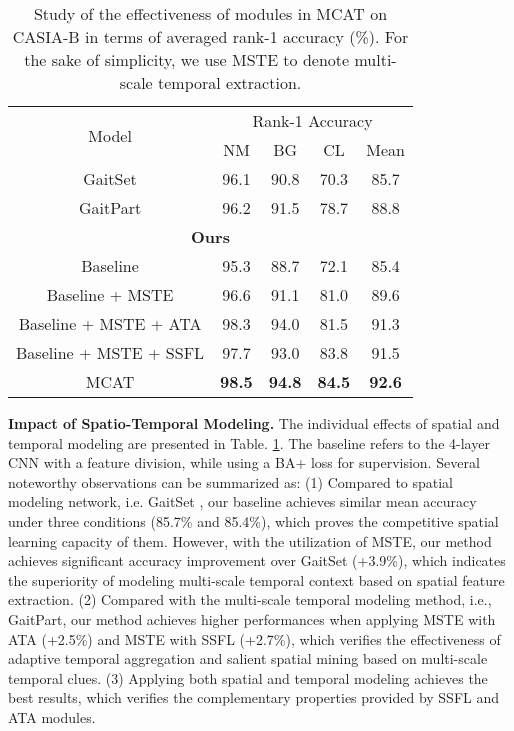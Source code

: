 \documentclass[journal]{IEEEtran}
\begin{document}
\begin{table}[ht]
    \footnotesize
    \centering
    \caption{Study of the effectiveness of modules in MCAT on CASIA-B in terms of averaged rank-1 accuracy (\%). For the sake of simplicity, we use MSTE to denote multi-scale temporal extraction.}
    \begin{tabular}{|c|c|c|c|c|}
        \hline
        \multirow{2}{*}{Model} & \multicolumn{4}{c|}{Rank-1 Accuracy} \\\cline{2-5}
        & NM & BG & CL & Mean\\\hline
        GaitSet \cite{chao2021gaitset} & 96.1 & 90.8 & 70.3 & 85.7 \\\hline
        GaitPart \cite{fan2020gaitpart} & 96.2 & 91.5 & 78.7 & 88.8 \\\hline
        \multicolumn{5}{|c|}{\textbf{Ours}} \\\hline
        Baseline & 95.3 & 88.7 & 72.1 & 85.4 \\\hline
        Baseline + MSTE & 96.6 & 91.1 & 81.0 & 89.6 \\\hline
        Baseline + MSTE + ATA & 98.3 & 94.0 & 81.5 & 91.3 \\\hline
        Baseline + MSTE + SSFL & 97.7 & 93.0 & 83.8 & 91.5 \\\hline
        MCAT & \textbf{98.5} & \textbf{94.8} & \textbf{84.5} & \textbf{92.6} \\\hline
    \end{tabular}
    \label{tab:spatio-temporal comparison}
\end{table}

\noindent \textbf{Impact of Spatio-Temporal Modeling.} The individual effects of spatial and temporal modeling are presented in Table. \ref{tab:spatio-temporal comparison}. The baseline refers to the 4-layer CNN with a feature division, while using a BA+ loss for supervision. Several noteworthy observations can be summarized as: (1) Compared to spatial modeling network, i.e. GaitSet \cite{chao2021gaitset}, our baseline achieves similar mean accuracy under three conditions (85.7\% and 85.4\%), which proves the competitive spatial learning capacity of them. However, with the utilization of MSTE, our method achieves significant accuracy improvement over GaitSet \cite{chao2021gaitset} (+3.9\%), which indicates the superiority of modeling multi-scale temporal context based on spatial feature extraction. (2) Compared with the multi-scale temporal modeling method, i.e., GaitPart, our method achieves higher performances when applying MSTE with ATA (+2.5\%) and MSTE with SSFL (+2.7\%), which verifies the effectiveness of adaptive temporal aggregation and salient spatial mining based on multi-scale temporal clues. (3) Applying both spatial and temporal modeling achieves the best results, which verifies the complementary properties provided by SSFL and ATA modules.
\end{document}
